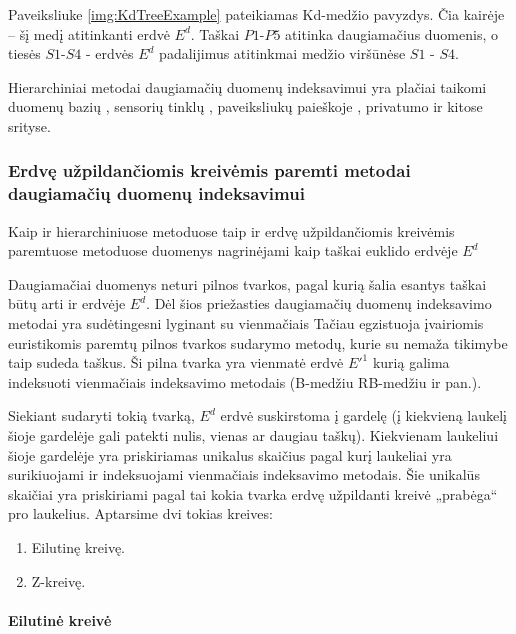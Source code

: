 Paveiksliuke \ref{img:KdTreeExample} pateikiamas Kd-medžio pavyzdys.
Čia kairėje -- šį medį atitinkanti erdvė $E^d$.
Taškai $P1$-$P5$ atitinka daugiamačius duomenis, o tiesės $S1$-$S4$ - erdvės $E^d$ padalijimus atitinkmai medžio viršūnėse $S1$ - $S4$.

Hierarchiniai metodai daugiamačių duomenų indeksavimui yra plačiai taikomi duomenų bazių \cite{bohm2001searching}, sensorių tinklų \cite{li2003multi}, paveiksliukų paieškoje \cite{silpa2008optimised}, privatumo \cite{hore2012secure} \cite{xiao2010differentially} ir kitose srityse.

\subsubsection{Erdvę užpildančiomis kreivėmis paremti metodai daugiamačių duomenų indeksavimui}

Kaip ir hierarchiniuose metoduose taip ir erdvę užpildančiomis kreivėmis paremtuose metoduose duomenys nagrinėjami kaip taškai euklido erdvėje $E^d$

Daugiamačiai duomenys neturi pilnos tvarkos, pagal kurią šalia esantys taškai būtų arti ir erdvėje $E^d$.
Dėl šios priežasties daugiamačių duomenų indeksavimo metodai yra sudėtingesni lyginant su vienmačiais \cite{gaede1998multidimensional} \cite{bohm2001searching}
Tačiau egzistuoja įvairiomis euristikomis paremtų pilnos tvarkos sudarymo metodų, kurie su nemaža tikimybe taip sudeda taškus.
Ši pilna tvarka yra vienmatė erdvė $E'^1$ kurią galima indeksuoti vienmačiais indeksavimo metodais (B-medžiu \cite{comer1979ubiquitous} RB-medžiu \cite{hanke1997relaxed} ir pan.).

Siekiant sudaryti tokią tvarką, $E^d$ erdvė suskirstoma į gardelę (į kiekvieną laukelį šioje gardelėje gali patekti nulis, vienas ar daugiau taškų).
Kiekvienam laukeliui šioje gardelėje yra priskiriamas unikalus skaičius pagal kurį laukeliai yra surikiuojami ir indeksuojami vienmačiais indeksavimo metodais.
Šie unikalūs skaičiai yra priskiriami pagal tai kokia tvarka erdvę užpildanti kreivė \cite{bader2012space} „prabėga“ pro laukelius.
Aptarsime dvi tokias kreives:
\begin{enumerate}
	\item Eilutinę kreivę.
	\item Z-kreivę.
\end{enumerate}

\paragraph{Eilutinė kreivė}

